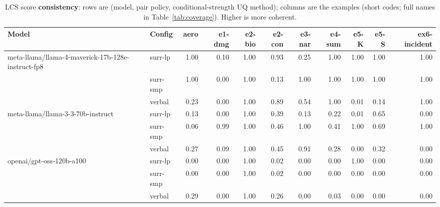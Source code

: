 \documentclass[11pt]{article}
\begin{document}
\begin{table}[htbp]
\centering
\footnotesize
\setlength{\tabcolsep}{3.5pt}
\caption{LCS score \textbf{consistency}: rows are (model, pair policy, conditional-strength UQ method); columns are the examples (short codes; full names in Table~\ref{tab:coverage}). Higher is more coherent.}
\label{tab:consistency}
\begin{tabular}{llrrrrrrrrr}
\toprule
\textbf{Model} & \textbf{Config} & \textbf{aero} & \textbf{e1-dmg} & \textbf{e2-bio} & \textbf{e2-con} & \textbf{e3-nar} & \textbf{e4-sum} & \textbf{e5-K} & \textbf{e5-S} & \textbf{ex6-incident} \\
\midrule
meta-llama/llama-4-maverick-17b-128e-instruct-fp8 & surr-lp & 1.00 & 0.10 & 1.00 & 0.93 & 0.25 & 1.00 & 1.00 & 1.00 & 1.00 \\
 & surr-smp & 1.00 & 0.00 & 1.00 & 0.13 & 1.00 & 1.00 & 1.00 & 1.00 & 1.00 \\
 & verbal & 0.23 & 0.00 & 1.00 & 0.89 & 0.54 & 1.00 & 0.01 & 0.14 & 1.00 \\
\midrule
meta-llama/llama-3-3-70b-instruct & surr-lp & 0.13 & 0.00 & 1.00 & 0.39 & 0.13 & 0.22 & 0.01 & 0.65 & 0.00 \\
 & surr-smp & 0.06 & 0.99 & 1.00 & 0.46 & 1.00 & 0.41 & 1.00 & 0.69 & 1.00 \\
 & verbal & 0.27 & 0.09 & 1.00 & 0.45 & 0.91 & 0.28 & 0.00 & 0.32 & 0.00 \\
\midrule
openai/gpt-oss-120b-a100 & surr-lp & 0.00 & 0.00 & 1.00 & 0.02 & 0.00 & 0.00 & 1.00 & 0.00 & 0.00 \\
 & surr-smp & 0.00 & 0.00 & 1.00 & 0.02 & 0.00 & 0.00 & 0.00 & 0.00 & 0.00 \\
 & verbal & 0.29 & 0.00 & 1.00 & 0.26 & 0.00 & 0.03 & 0.00 & 0.00 & 0.00 \\
\bottomrule
\end{tabular}
\end{table}
\end{document}
